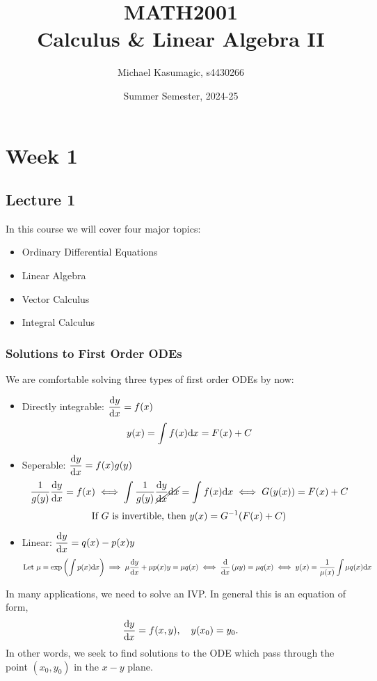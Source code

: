 \documentclass{report}
\title{\Huge{MATH2001}\\Calculus \& Linear Algebra II}
\author{\huge{Michael Kasumagic, s4430266}}
\date{\huge{Summer Semester, 2024-25}}
\begin{document}
\maketitle
\newpage%
\tableofcontents
\pagebreak

\chapter{Week 1}
\section{Lecture 1}
In this course we will cover four major topics:
\begin{itemize}
  \item Ordinary Differential Equations
  \item Linear Algebra
  \item Vector Calculus
  \item Integral Calculus
\end{itemize}

\subsection{Solutions to First Order ODEs}
We are comfortable solving three types of first order ODEs by now:
\begin{itemize}
  \item Directly integrable: $\displaystyle{\frac{\mathrm{d}y}{\mathrm{d}x}= f(x)}$
  $$
    y(x) = \int f(x) \mathrm{d} x = F(x) + C
  $$
  \item Seperable: $\displaystyle{\frac{\mathrm{d}y}{\mathrm{d}x}= f(x)g(y)}$
  $$
    \frac{1}{g(y)}\frac{\mathrm{d} y}{\mathrm{d} x} = f(x) \iff \int \frac{1}{g(y)}\frac{\mathrm{d} y}{\cancel{\mathrm{d} x}}\cancel{\mathrm{d} x} = \int f(x) \mathrm{d} x \iff G(y(x)) = F(x) + C
  $$
  $$
    \text{If } G \text{ is invertible, then } y(x) = G^{-1}(F(x)+C) 
  $$
  \item Linear: $\displaystyle{\frac{\mathrm{d}y}{\mathrm{d}x}= q(x) - p(x)y}$
  $$
    \text{Let }\mu = \exp\left( \int p(x)\mathrm{d} x \right)\implies \mu\frac{\mathrm{d} y}{\mathrm{d} x} + \mu p(x)y = \mu q(x) \iff \frac{\mathrm{d}}{\mathrm{d} x}\left( \mu y \right) = \mu q(x) \iff y(x) = \frac{1}{\mu(x)}\int \mu q(x)\mathrm{d} x
  $$
\end{itemize}

In many applications, we need to solve an IVP. In general this is an equation of form,
$$
  \frac{\mathrm{d} y}{\mathrm{d} x} = f(x,y),\quad y(x_0) = y_0.
$$
In other words, we seek to find solutions to the ODE which pass through the point $(x_0, y_0)$ in the $x{-}y$ plane.

\end{document}
